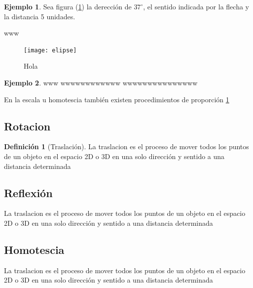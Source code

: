 \documentclass[
  16pt,
]{krantz}
\theoremstyle{definition}
\newtheorem{definition}{Definición}[chapter]
\theoremstyle{definition}
\newtheorem{example}{Ejemplo}[chapter]
\theoremstyle{definition}
\theoremstyle{definition}
\theoremstyle{remark}
\begin{document}
\begin{example}
\protect\hypertarget{exm:unnamed-chunk-3}{}{\label{exm:unnamed-chunk-3} }Sea figura (\ref{fig:Doge}) la derección de \(37^\circ\), el sentido indicada por la flecha y la distancia 5 unidades.
\end{example}

www

\begin{figure}

{\centering \texttt{[image: elipse]} 

}

\caption{Hola}\label{fig:Doge}
\end{figure}

\begin{example}
\protect\hypertarget{exm:unnamed-chunk-4}{}{\label{exm:unnamed-chunk-4} }www wwwwwwwwwwww wwwwwwwwwwwwwww
\end{example}

En la escala u homotescia también existen procedimientos de proporción \ref{fig:Doge}

\hypertarget{rotacion}{%
\subsection{Rotacion}\label{rotacion}}

\begin{definition}[Traslación]
\protect\hypertarget{def:rotacion}{}{\label{def:rotacion} {} }La traslacion es el proceso de mover todos los puntos de un objeto en el espacio 2D o 3D en una solo dirección y sentido a una distancia determinada
\end{definition}

\hypertarget{reflexiuxf3n}{%
\subsection{Reflexión}\label{reflexiuxf3n}}

La traslacion es el proceso de mover todos los puntos de un objeto en el espacio 2D o 3D en una solo dirección y sentido a una distancia determinada

\hypertarget{homotescia}{%
\subsection{Homotescia}\label{homotescia}}

La traslacion es el proceso de mover todos los puntos de un objeto en el espacio 2D o 3D en una solo dirección y sentido a una distancia determinada
\end{document}
